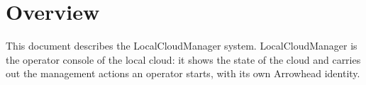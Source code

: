 \documentclass[a4paper]{arrowhead}
\begin{document}
\sloppy

\ArrowheadSetup

\begin{center}
  \vspace*{1cm}
  \huge{\arrowtitle}

  \vspace*{0.2cm}
  \LARGE{\arrowtype}
  \vspace*{1cm}

  \vspace*{\fill}


  \vspace*{1cm}
  \vspace*{\fill}

  \begin{abstract}
    This document describes the LocalCloudManager support system of the Eclipse Arrowhead 5.2.2 framework, as implemented in \texttt{ah5-LocalCloudManager-java-spring} of the primary Java source tree (\texttt{Eclipse-Arrowhead-java}) (Java-Spring with the vendored Eclipse Arrowhead common library) and deployed with the standalone Compose definition of that folder.
  \end{abstract}

  \vspace*{1cm}
\end{center}

\newpage

\tableofcontents
\newpage

\section{Overview}
\label{sec:overview}

This document describes the LocalCloudManager system. LocalCloudManager is the operator console of the local cloud: it shows the state of the cloud and carries out the management actions an operator starts, with its own Arrowhead identity.
\end{document}
